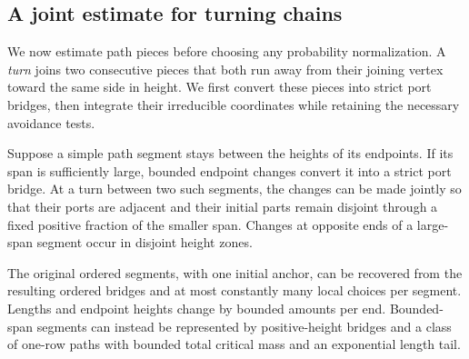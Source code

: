 \subsection{A joint estimate for turning chains}

We now estimate path pieces before choosing any probability normalization.
A \emph{turn} joins two consecutive pieces that both run away from their
joining vertex toward the same side in height.  We first convert these
pieces into strict port bridges, then integrate their irreducible
coordinates while retaining the necessary avoidance tests.

\begin{lemma}\label{R:geo:port-repair}
Suppose a simple path segment stays between the heights of its endpoints.
If its span is sufficiently large, bounded endpoint changes convert it
into a strict port bridge.  At a turn between two such segments, the
changes can be made jointly so that their ports are adjacent and their
initial parts remain disjoint through a fixed positive fraction of the
smaller span.  Changes at opposite ends of a large-span segment occur in
disjoint height zones.

The original ordered segments, with one initial anchor, can be recovered
from the resulting ordered bridges and at most constantly many local
choices per segment.  Lengths and endpoint heights change by bounded
amounts per end.  Bounded-span segments can instead be represented by
positive-height bridges and a class of one-row paths with bounded total
critical mass and an exponential length tail.
\end{lemma}
